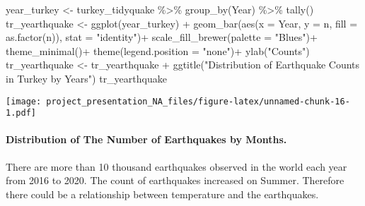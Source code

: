 \documentclass[
]{article}
\newenvironment{Shaded}{\begin{snugshade}}{\end{snugshade}}
\newcommand{\AttributeTok}[1]{\textcolor[rgb]{0.77,0.63,0.00}{#1}}
\newcommand{\FunctionTok}[1]{\textcolor[rgb]{0.00,0.00,0.00}{#1}}
\newcommand{\NormalTok}[1]{#1}
\newcommand{\OtherTok}[1]{\textcolor[rgb]{0.56,0.35,0.01}{#1}}
\newcommand{\SpecialCharTok}[1]{\textcolor[rgb]{0.00,0.00,0.00}{#1}}
\newcommand{\StringTok}[1]{\textcolor[rgb]{0.31,0.60,0.02}{#1}}
\begin{document}
\begin{Shaded}
\begin{Highlighting}[]
\NormalTok{year\_turkey }\OtherTok{\textless{}{-}}\NormalTok{ turkey\_tidyquake }\SpecialCharTok{\%\textgreater{}\%}
                \FunctionTok{group\_by}\NormalTok{(Year) }\SpecialCharTok{\%\textgreater{}\%} 
                \FunctionTok{tally}\NormalTok{()}
\NormalTok{tr\_yearthquake }\OtherTok{\textless{}{-}} \FunctionTok{ggplot}\NormalTok{(year\_turkey) }\SpecialCharTok{+} \FunctionTok{geom\_bar}\NormalTok{(}\FunctionTok{aes}\NormalTok{(}\AttributeTok{x =}\NormalTok{ Year, }\AttributeTok{y =}\NormalTok{ n, }\AttributeTok{fill =} \FunctionTok{as.factor}\NormalTok{(n)),}
                                                 \AttributeTok{stat =} \StringTok{"identity"}\NormalTok{)}\SpecialCharTok{+}
                  \FunctionTok{scale\_fill\_brewer}\NormalTok{(}\AttributeTok{palette =} \StringTok{"Blues"}\NormalTok{)}\SpecialCharTok{+}
                  \FunctionTok{theme\_minimal}\NormalTok{()}\SpecialCharTok{+}
                  \FunctionTok{theme}\NormalTok{(}\AttributeTok{legend.position =} \StringTok{"none"}\NormalTok{)}\SpecialCharTok{+}
                  \FunctionTok{ylab}\NormalTok{(}\StringTok{"Counts"}\NormalTok{)}
\NormalTok{tr\_yearthquake }\OtherTok{\textless{}{-}}\NormalTok{ tr\_yearthquake }\SpecialCharTok{+} \FunctionTok{ggtitle}\NormalTok{(}\StringTok{"Distribution of Earthquake Counts in Turkey by Years"}\NormalTok{)}
\NormalTok{tr\_yearthquake}
\end{Highlighting}
\end{Shaded}

\texttt{[image: project\_presentation\_NA\_files/figure-latex/unnamed-chunk-16-1.pdf]}

\hypertarget{distribution-of-the-number-of-earthquakes-by-months.}{%
\paragraph{Distribution of The Number of Earthquakes by
Months.}\label{distribution-of-the-number-of-earthquakes-by-months.}}

There are more than 10 thousand earthquakes observed in the world each
year from 2016 to 2020. The count of earthquakes increased on Summer.
Therefore there could be a relationship between temperature and the
earthquakes.
\end{document}
